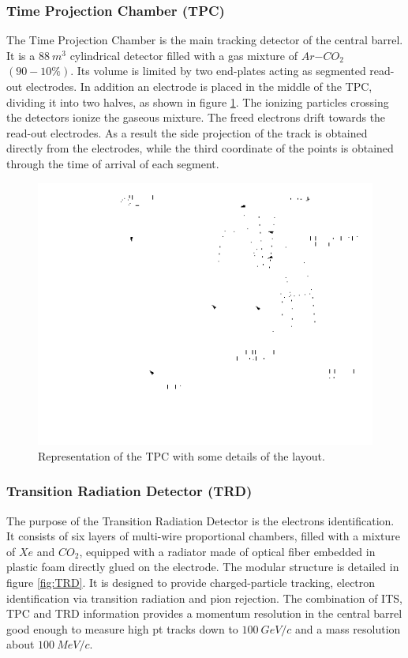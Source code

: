 \subsubsection{Time Projection Chamber (TPC)}
The Time Projection Chamber is the main tracking detector of the central barrel.
It is a $88\ m^3$ cylindrical detector filled with a gas mixture of $Ar$−$CO_2$ $(90-10\%)$.
Its volume is limited by two end-plates acting as segmented read-out electrodes. 
In addition an electrode is placed in the middle of the TPC, dividing it into two halves, as shown in figure \ref{fig:TPC}.
The ionizing particles crossing the detectors ionize the gaseous mixture.
The freed electrons drift towards the read-out electrodes.
As a result the side projection of the track is obtained directly from the electrodes, while the third coordinate of the points is obtained through the time of arrival of each segment.

\begin{figure}[!h]
\begin{center}
\includegraphics[width=0.7\linewidth]{Chapters/Introduction/Figs/tpc.png}
\caption{Representation of the TPC with some details of the layout.}
\label{fig:TPC}
\end{center}
\end{figure}

\subsubsection{Transition Radiation Detector (TRD)}
The purpose of the Transition Radiation Detector is the electrons identification.
It consists of six layers of multi-wire proportional chambers, filled with a mixture of $Xe$ and $CO_2$, equipped with a radiator made of optical fiber embedded in plastic foam directly glued on the electrode.
The modular structure is detailed in figure \ref{fig:TRD}.
It is designed to provide charged-particle tracking, electron identification via transition radiation and pion rejection. 
The combination of ITS, TPC and TRD information provides a momentum resolution in the central barrel good enough to measure high pt tracks down to $100\ GeV/c$ and a mass resolution about $100\ MeV/c$.

